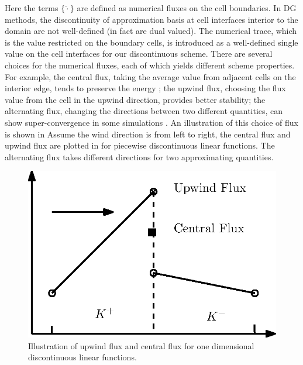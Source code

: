 \documentclass[preprint,11pt]{elsarticle}
\begin{document}
Here the terms $\{\hat{\cdot}\}$ 
%
%
are defined as numerical fluxes on the cell boundaries. In DG methods, the discontinuity of approximation basis at cell interfaces interior to the domain are not well-defined (in fact are dual valued). The numerical trace, {\color{blue}which is the value restricted on the boundary cells,} 
%
%
is introduced as a well-defined single value on the cell interfaces for our discontinuous scheme. There are several choices for the numerical fluxes, each of which yields different scheme properties. For example, the central flux, taking the average value from adjacent cells on the interior edge, tends to preserve the energy \cite{zhang2003analysis} ; the upwind flux, choosing the flux value from the cell in the upwind direction, provides better stability; the alternating flux, changing the directions between two different quantities, can show super-convergence in some simulations \cite{Castillo2006,CockburnShu1998}. An illustration of this choice of flux is shown in Assume the wind direction is from left to right, the central flux and upwind flux are plotted in  for piecewise discontinuous linear functions. The alternating flux takes different directions for two approximating quantities.

\begin{figure}[H]
\centering
\includegraphics[width=.4\textwidth]{./FIGURES/Fig_UF_CF}
\caption{Illustration of upwind flux and central flux for one dimensional discontinuous linear functions.}\label{Fig:FLUX_CF_UF}
\end{figure}
\end{document}
